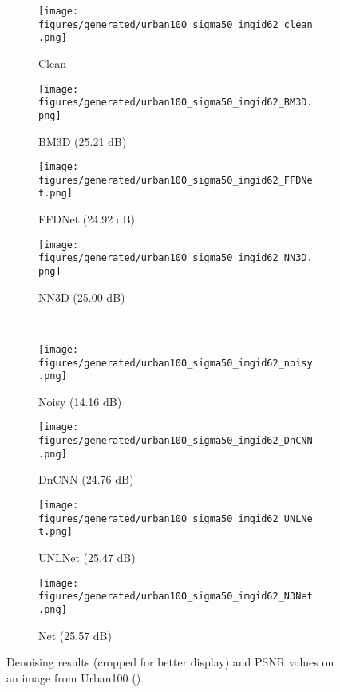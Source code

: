 \documentclass{article}
\begin{document}
\begin{figure*}[tb]
	\begin{subfigure}{0.225\linewidth}
	\texttt{[image: figures/generated/urban100\_sigma50\_imgid62\_clean.png]}
	\caption{Clean}
	\end{subfigure}
	\hfill
	\begin{subfigure}{0.225\linewidth}
	{\texttt{[image: figures/generated/urban100\_sigma50\_imgid62\_BM3D.png]}}
	\caption{BM3D (25.21 dB)}
	\end{subfigure}
	\hfill
	\begin{subfigure}{0.225\linewidth}
	\texttt{[image: figures/generated/urban100\_sigma50\_imgid62\_FFDNet.png]}
	\caption{FFDNet (24.92 dB)}
	\end{subfigure}
	\hfill
	\begin{subfigure}{0.225\linewidth}
	\texttt{[image: figures/generated/urban100\_sigma50\_imgid62\_NN3D.png]}
	\caption{NN3D (25.00 dB)}
	\end{subfigure}
	\\\begin{subfigure}{0.225\linewidth}
	\texttt{[image: figures/generated/urban100\_sigma50\_imgid62\_noisy.png]}
	\caption{Noisy (14.16 dB)}
	\end{subfigure}
	\hfill
	\begin{subfigure}{0.225\linewidth}
	\texttt{[image: figures/generated/urban100\_sigma50\_imgid62\_DnCNN.png]}
	\caption{DnCNN (24.76 dB)}
	\end{subfigure} 
	\hfill
	\begin{subfigure}{0.225\linewidth}
	\texttt{[image: figures/generated/urban100\_sigma50\_imgid62\_UNLNet.png]}
	\caption{UNLNet (25.47 dB)}
	\end{subfigure}
	\hfill
	\begin{subfigure}{0.225\linewidth}
	\texttt{[image: figures/generated/urban100\_sigma50\_imgid62\_N3Net.png]}
	\caption{Net (25.57 dB)}
	\end{subfigure}
\caption{Denoising results (cropped for better display) and PSNR values on an image from Urban100 ().}
\label{fig:denoising_urban100_s50_i62}
\vspace{-0.5em}
\end{figure*}
\end{document}
